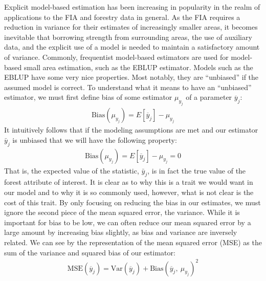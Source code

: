 \documentclass[12pt,twoside]{reedthesis}
\begin{document}
Explicit model-based estimation has been increasing in popularity in the realm of applications to the FIA and forestry data in general. As the FIA requires a reduction in variance for their estimates of increasingly smaller areas, it becomes inevitable that borrowing strength from surrounding areas, the use of auxiliary data, and the explicit use of a model is needed to maintain a satisfactory amount of variance. Commonly, frequentist model-based estimators are used for model-based small area estimation, such as the EBLUP estimator. Models such as the EBLUP have some very nice properties. Most notably, they are ``unbiased'' if the assumed model is correct. To understand what it means to have an ``unbiased'' estimator, we must first define bias of some estimator \(\mu_{y_j}\) of a parameter \(\overline y_j\):
\begin{align}
\text{Bias}(\mu_{y_j}) = E[\overline y_j] - \mu_{y_j}
\end{align}
It intuitively follows that if the modeling assumptions are met and our estimator \(\bar y_j\) is unbiased that we will have the following property:
\begin{align}
\text{Bias}(\mu_{y_j}) = E[\overline y_j] - \mu_{y_j} = 0
\end{align}
That is, the expected value of the statistic, \(\bar y_j\), is in fact the true value of the forest attribute of interest. It is clear as to why this is a trait we would want in our model and to why it is so commonly used, however, what is not clear is the cost of this trait. By only focusing on reducing the bias in our estimates, we must ignore the second piece of the mean squared error, the variance. While it is important for bias to be low, we can often reduce our mean squared error by a large amount by increasing bias slightly, as bias and variance are inversely related. We can see by the representation of the mean squared error (MSE) as the sum of the variance and squared bias of our estimator:
\begin{align}
\text{MSE}(\overline y_j) = \text{Var}(\overline y_j) + \text{Bias}(\overline y_j,~ \mu_{y_j})^2
\end{align}
\end{document}
